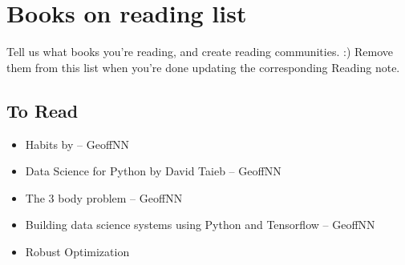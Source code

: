 
\section{Books on reading list}
Tell us what books you're reading, and create reading communities. :) Remove them from this list when you're done updating the corresponding Reading note.

\subsection{To Read}
\begin{itemize}
    \item Habits by
    -- GeoffNN
    \item Data Science for Python by David Taieb
    -- GeoffNN
    \item The 3 body problem
    -- GeoffNN
    \item Building data science systems using Python and Tensorflow
    -- GeoffNN
    \item Robust Optimization
\end{itemize}
